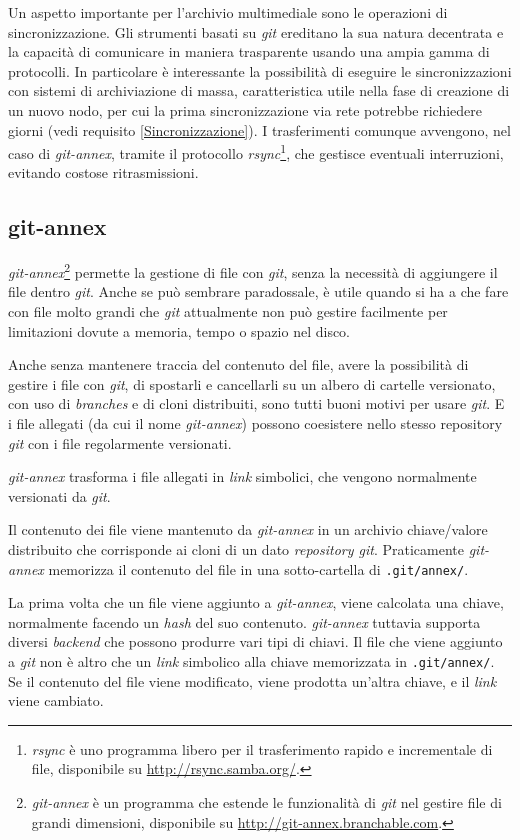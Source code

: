 Un aspetto importante per l'archivio multimediale sono le operazioni
di sincronizzazione. Gli strumenti basati su \emph{git} ereditano la
sua natura decentrata e la capacità di comunicare in maniera
trasparente usando una ampia gamma di protocolli. In particolare è
interessante la possibilità di eseguire le sincronizzazioni con
sistemi di archiviazione di massa, caratteristica utile nella fase di
creazione di un nuovo nodo, per cui la prima sincronizzazione via rete
potrebbe richiedere giorni (vedi requisito \ref{Sincronizzazione}). I
trasferimenti comunque avvengono, nel caso di \emph{git-annex},
tramite il protocollo \emph{rsync}\footnote{\emph{rsync} è uno
  programma libero per il trasferimento rapido e incrementale di file,
  disponibile su \url{http://rsync.samba.org/}.}, che gestisce
eventuali interruzioni, evitando costose ritrasmissioni.

\subsection{git-annex}\label{git-annex}
\emph{git-annex}\footnote{\emph{git-annex} è un programma che estende
  le funzionalità di \emph{git} nel gestire file di grandi dimensioni,
  disponibile su \url{http://git-annex.branchable.com}.} permette la
gestione di file con \emph{git}, senza la necessità di aggiungere il
file dentro \emph{git}. Anche se può sembrare paradossale, è utile
quando si ha a che fare con file molto grandi che \emph{git}
attualmente non può gestire facilmente per limitazioni dovute a
memoria, tempo o spazio nel disco.

Anche senza mantenere traccia del contenuto del file, avere la 
possibilità di gestire i file con \emph{git}, di spostarli e cancellarli su un
albero di cartelle versionato, con uso di \emph{branches} e di cloni
distribuiti, sono tutti buoni motivi per usare \emph{git}. E i file allegati
(da cui il nome \emph{git-annex}) possono coesistere nello stesso repository
\emph{git} con i file regolarmente versionati.

\emph{git-annex} trasforma i file allegati in \emph{link}
simbolici, che vengono normalmente versionati da \emph{git}. 

Il contenuto dei file viene mantenuto da \emph{git-annex} in un
archivio chiave/valore distribuito che corrisponde ai cloni di un
dato \emph{repository git}. Praticamente \emph{git-annex} memorizza il
contenuto del file in una sotto-cartella di \verb|.git/annex/|.

La prima volta che un file viene aggiunto a \emph{git-annex}, viene
calcolata una chiave, normalmente facendo un \emph{hash} del suo
contenuto. \emph{git-annex} tuttavia supporta diversi \emph{backend}
che possono produrre vari tipi di chiavi. Il file che viene aggiunto a
\emph{git} non è altro che un \emph{link} simbolico alla chiave
memorizzata in \verb|.git/annex/|. Se il contenuto del file viene
modificato, viene prodotta un'altra chiave, e il \emph{link} viene
cambiato.

